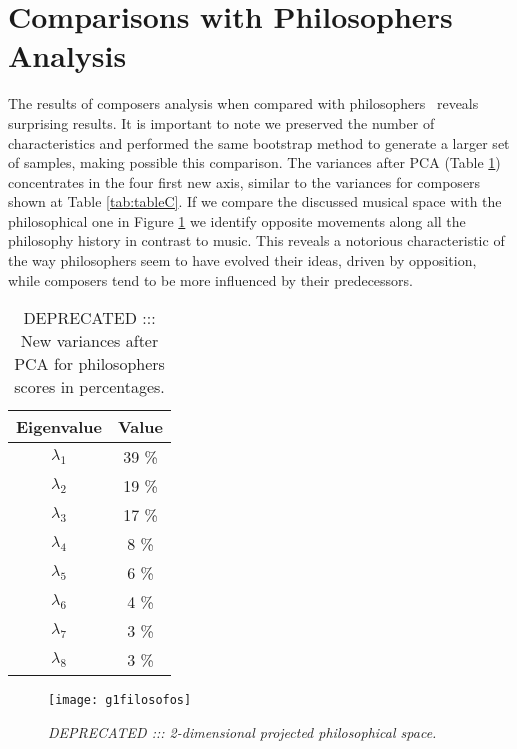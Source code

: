 \documentclass[
 aip,
 jmp,
 amsmath,amssymb,
 reprint,
]{revtex4-1}
\begin{document}
\section{Comparisons with Philosophers Analysis}

The results of composers analysis when compared with philosophers~\cite{Fabbri}
reveals surprising results. It is important to note we preserved the
number of characteristics and performed the same bootstrap method to
generate a larger set of samples, making possible this
comparison. The variances after PCA (Table \ref{tab:varphi}) concentrates in the four
first new axis, similar to the variances for composers shown at Table \ref{tab:tableC}. If we compare the discussed musical space
with the philosophical one in Figure \ref{fig:phipca} we
identify opposite movements along all the philosophy history in contrast
to music. This reveals a notorious characteristic of the way
philosophers seem to have evolved their ideas, driven by opposition, while
composers tend to be more influenced by their predecessors.

\begin{table}[ht]
\caption{\label{tab:varphi}DEPRECATED ::: New variances after PCA for philosophers
  scores in percentages.}

\begin{tabular}{|c||c|}
\hline
Eigenvalue  & Value     \\ \hline

$\lambda_1$ &  39 \% \\
$\lambda_2$ &  19 \% \\
$\lambda_3$ &  17 \% \\
$\lambda_4$ &   8 \% \\
$\lambda_5$ &   6 \% \\
$\lambda_6$ &   4 \% \\
$\lambda_7$ &   3 \% \\
$\lambda_8$ &   3 \% \\
\hline

\end{tabular}
\end{table}


\begin{figure}
  \begin{center}
    \texttt{[image: g1filosofos]}
  \end{center}
  \caption{\it DEPRECATED ::: 2-dimensional projected philosophical space.}
  \label{fig:phipca}
\end{figure}
\end{document}
